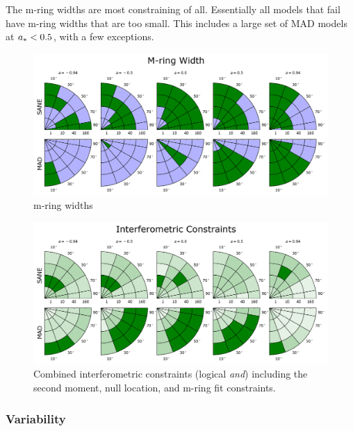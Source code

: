 The m-ring widths are most constraining of all.  Essentially all models that fail have m-ring widths that are too small.  This includes a large set of MAD models at $a_* < 0.5$, with a few exceptions.

\begin{figure}
  \centering
  \includegraphics[width=\columnwidth]{./figures/Mring_w_Constraints.png}
  \caption{m-ring widths}
  \label{fig:cmp_m-ring_width}
\end{figure}


\begin{figure}
  \centering
    \includegraphics[width=\columnwidth]{./figures/Interferometric_Constraints.png}
  \caption{Combined interferometric constraints (logical {\em and}) including the second moment, null location, and m-ring fit constraints.}
  \label{fig:all_EHT_constraints}
\end{figure}

\subsubsection{Variability}

